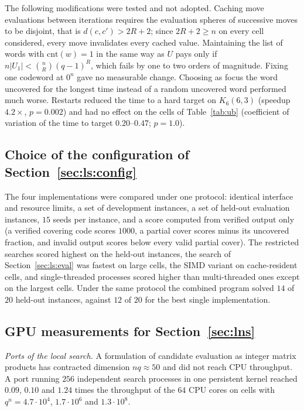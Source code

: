 \documentclass[11pt]{amsart}
\newcommand{\Kq}[3]{K_{#1}(#2,#3)}
\begin{document}
The following modifications were tested and not adopted. Caching move
evaluations between iterations requires the evaluation spheres of
successive moves to be disjoint, that is $d(c,c')>2R+2$; since $2R+2\ge n$
on every cell considered, every move invalidates every cached value.
Maintaining the list of words with $\mathrm{cnt}(w)=1$ in the same way as
$U$ pays only if $n|U_1|<\binom{n}{R}(q-1)^R$, which fails by one to two
orders of magnitude. Fixing one codeword at $0^n$ gave no measurable
change. Choosing as focus the word uncovered for the longest time instead
of a random uncovered word performed much worse. Restarts reduced the time
to a hard target on $\Kq{6}{6}{3}$ (speedup $4.2\times$, $p=0.002$) and
had no effect on the cells of Table~\ref{tab:ub} (coefficient of variation
of the time to target $0.20$--$0.47$; $p=1.0$).

\subsection{Choice of the configuration of Section~\textup{\ref{sec:ls:config}}}
\label{app:impl:arena}

The four implementations were compared under one protocol: identical
interface and resource limits, a set of development instances, a set of
held-out evaluation instances, $15$ seeds per instance, and a score
computed from verified output only (a verified covering code scores
$1000$, a partial cover scores minus its uncovered fraction, and invalid
output scores below every valid partial cover). The restricted searches
scored highest on the held-out instances, the search of
Section~\ref{sec:ls:eval} was fastest on large cells, the SIMD variant on
cache-resident cells, and single-threaded processes scored higher than
multi-threaded ones except on the largest cells. Under the same protocol
the combined program solved $14$ of $20$ held-out instances, against $12$
of $20$ for the best single implementation.

\subsection{GPU measurements for Section~\textup{\ref{sec:lns}}}
\label{app:impl:gpu}

\emph{Ports of the local search.} A formulation of candidate evaluation as
integer matrix products has contracted dimension $nq\approx 50$ and did
not reach CPU throughput. A port running $256$ independent search
processes in one persistent kernel reached $0.09$, $0.10$ and $1.24$ times
the throughput of the $64$ CPU cores on cells with $q^n=4.7\cdot 10^4$,
$1.7\cdot 10^6$ and $1.3\cdot 10^8$.
\end{document}
